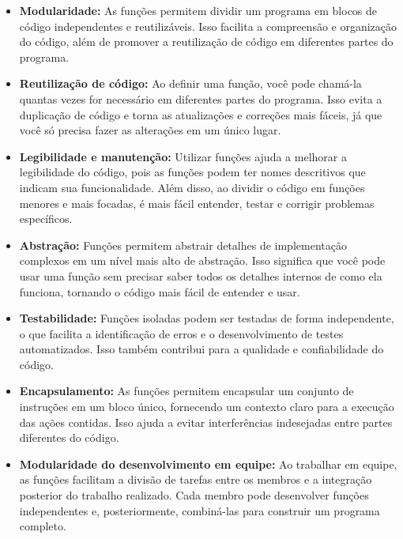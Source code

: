 \documentclass[a4paper, 12pt, onecolumn,singlespacing]{article}
\begin{document}
	\begin{itemize}
		\item \textbf{Modularidade:} As funções permitem dividir um programa em blocos de código independentes e reutilizáveis. Isso facilita a compreensão e organização do código, além de promover a reutilização de código em diferentes partes do programa.
		
		\item \textbf{Reutilização de código:} Ao definir uma função, você pode chamá-la quantas vezes for necessário em diferentes partes do programa. Isso evita a duplicação de código e torna as atualizações e correções mais fáceis, já que você só precisa fazer as alterações em um único lugar.
		
		\item \textbf{Legibilidade e manutenção:} Utilizar funções ajuda a melhorar a legibilidade do código, pois as funções podem ter nomes descritivos que indicam sua funcionalidade. Além disso, ao dividir o código em funções menores e mais focadas, é mais fácil entender, testar e corrigir problemas específicos.
		
		\item \textbf{Abstração:} Funções permitem abstrair detalhes de implementação complexos em um nível mais alto de abstração. Isso significa que você pode usar uma função sem precisar saber todos os detalhes internos de como ela funciona, tornando o código mais fácil de entender e usar.
		
		\item \textbf{Testabilidade:} Funções isoladas podem ser testadas de forma independente, o que facilita a identificação de erros e o desenvolvimento de testes automatizados. Isso também contribui para a qualidade e confiabilidade do código.
		
		\item \textbf{Encapsulamento:} As funções permitem encapsular um conjunto de instruções em um bloco único, fornecendo um contexto claro para a execução das ações contidas. Isso ajuda a evitar interferências indesejadas entre partes diferentes do código.
		
		\item \textbf{Modularidade do desenvolvimento em equipe:} Ao trabalhar em equipe, as funções facilitam a divisão de tarefas entre os membros e a integração posterior do trabalho realizado. Cada membro pode desenvolver funções independentes e, posteriormente, combiná-las para construir um programa completo.
	\end{itemize}
	
	
\end{document}
